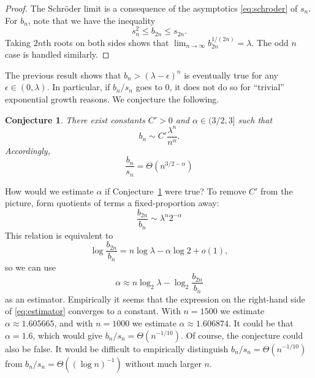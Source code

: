 \documentclass{article}
\theoremstyle{plain}
\theoremstyle{definition}
\theoremstyle{plain}
\newtheorem{conjecture}[theorem]{Conjecture}
\begin{document}
\begin{proof}
    The Schr\"oder limit is a consequence of the asymptotics
    \eqref{eq:schroder} of $s_n$. For $b_n$, note that we have the inequality
    \begin{equation*}
        s_n^2 \leq b_{2n} \leq s_{2n}.
    \end{equation*}
    Taking $2n$th roots on both sides shows that $\lim_{n \to \infty}
    b_{2n}^{1/(2n)} = \lambda$. The odd $n$ case is handled similarly.
\end{proof}

The previous result shows that $b_n > (\lambda - \epsilon)^n$ is eventually true
for any $\epsilon \in (0, \lambda)$. In particular, if $b_n / s_n$ goes to $0$,
it does not do so for ``trivial'' exponential growth reasons. We conjecture the
following.

\begin{conjecture}
    \label{conjecture-asym}
    There exist constants $C' > 0$ and $\alpha \in (3/2, 3]$ such that
    \begin{equation*}
        b_n \sim C' \frac{\lambda^n}{n^\alpha}.
    \end{equation*}
    Accordingly,
    \begin{equation*}
        \frac{b_n}{s_n} = \Theta(n^{3/2 - \alpha})
    \end{equation*}
\end{conjecture}

How would we estimate $\alpha$ if Conjecture~\ref{conjecture-asym} were true? To
remove $C'$ from the picture, form quotients of terms a fixed-proportion away:
\begin{equation*}
    \frac{b_{2n}}{b_n} \sim \lambda^n 2^{-\alpha}
\end{equation*}
This relation is equivalent to
\begin{equation*}
    \log \frac{b_{2n}}{b_n} = n \log \lambda - \alpha \log 2 + o(1),
\end{equation*}
so we can use
\begin{equation}
    \label{eq:estimator}
    \alpha \approx n \log_2 \lambda - \log_2 \frac{b_{2n}}{b_n}
\end{equation}
as an estimator. Empirically it seems that the expression on the right-hand side
of \eqref{eq:estimator} converges to a constant. With $n = 1500$ we estimate
$\alpha \approx 1.605665$, and with $n = 1000$ we estimate $\alpha \approx
1.606874$. It could be that $\alpha = 1.6$, which would give $b_n / s_n =
\Theta(n^{-1/10})$. Of course, the conjecture could also be false. It would be
difficult to empirically distinguish $b_n / s_n = \Theta(n^{-1/10})$ from $b_n /
s_n = \Theta((\log n)^{-1})$ without much larger $n$.
\end{document}
